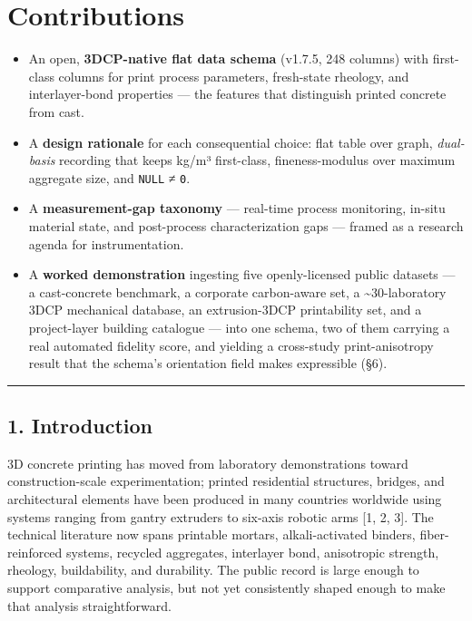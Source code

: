 \documentclass[
  11pt,
  letterpaper,
]{article}
\providecommand{\tightlist}{%
  \setlength{\itemsep}{0pt}\setlength{\parskip}{0pt}}
\begin{document}
\section{Contributions}\label{contributions}

\begin{itemize}
\tightlist
\item
  An open, \textbf{3DCP-native flat data schema} (v1.7.5, 248 columns)
  with first-class columns for print process parameters, fresh-state
  rheology, and interlayer-bond properties --- the features that
  distinguish printed concrete from cast.
\item
  A \textbf{design rationale} for each consequential choice: flat table
  over graph, \emph{dual-basis} recording that keeps kg/m³ first-class,
  fineness-modulus over maximum aggregate size, and \texttt{NULL} ≠
  \texttt{0}.
\item
  A \textbf{measurement-gap taxonomy} --- real-time process monitoring,
  in-situ material state, and post-process characterization gaps ---
  framed as a research agenda for instrumentation.
\item
  A \textbf{worked demonstration} ingesting five openly-licensed public
  datasets --- a cast-concrete benchmark, a corporate carbon-aware set,
  a \textasciitilde30-laboratory 3DCP mechanical database, an
  extrusion-3DCP printability set, and a project-layer building
  catalogue --- into one schema, two of them carrying a real automated
  fidelity score, and yielding a cross-study print-anisotropy result
  that the schema's orientation field makes expressible (§6).
\end{itemize}

\begin{center}\rule{0.5\linewidth}{0.5pt}\end{center}

\subsection{1. Introduction}\label{introduction}

3D concrete printing has moved from laboratory demonstrations toward
construction-scale experimentation; printed residential structures,
bridges, and architectural elements have been produced in many countries
worldwide using systems ranging from gantry extruders to six-axis
robotic arms {[}1, 2, 3{]}. The technical literature now spans printable
mortars, alkali-activated binders, fiber-reinforced systems, recycled
aggregates, interlayer bond, anisotropic strength, rheology,
buildability, and durability. The public record is large enough to
support comparative analysis, but not yet consistently shaped enough to
make that analysis straightforward.
\end{document}

